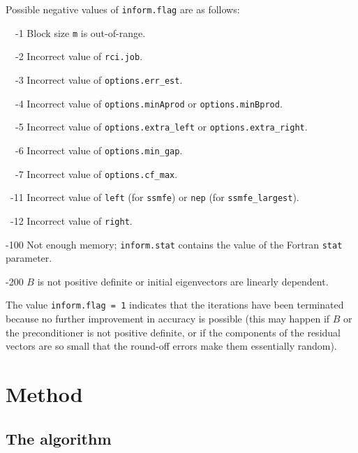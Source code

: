 Possible negative values of {\tt inform.flag}
are as follows:
%
\begin{description}
%
\item{~~-1}
\hskip 9pt
Block size {\tt m} is out-of-range.
%
\item{~~-2}
\hskip 9pt
Incorrect value of {\tt rci.job}. 
%
\item{~~-3}
\hskip 9pt
Incorrect value of {\tt options.err\_est}. 
%
\item{~~-4}
\hskip 9pt
Incorrect value of 
{\tt options.minAprod} or {\tt options.minBprod}.
%
\item{~~-5}
\hskip 9pt
Incorrect value of 
{\tt options.extra\_left} or
{\tt options.extra\_right}.
%
\item{~~-6}
\hskip 9pt
Incorrect value of {\tt options.min\_gap}. 
%
\item{~~-7}
\hskip 9pt
Incorrect value of {\tt options.cf\_max}. 
%
\item{~-11}
\hskip 7pt
Incorrect value of {\tt left} (for {\tt ssmfe})
or {\tt nep} (for {\tt ssmfe\_largest}).
%
\item{~-12}
\hskip 7pt
Incorrect value of {\tt right}. 
%
\item{-100}
\hskip 4pt
Not enough memory;
{\tt inform.stat} contains the value of the Fortran {\tt stat} parameter.
%
\item{-200}
\hskip 4pt
$B$ is not positive definite or initial eigenvectors are linearly dependent.
%
\end{description}

%
The value {\tt inform.flag = 1}
indicates that
the iterations have been terminated because no further improvement
in accuracy is possible (this may happen if $B$ or the preconditioner is
not positive definite, or if the components of the residual vectors
are so small that the round-off
errors make them essentially random).
%

\section{Method}
\label{sec:method}

\subsection{The algorithm}


